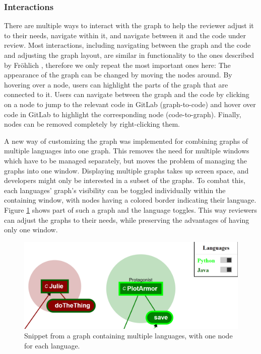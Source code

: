\documentclass[a4paper,11pt,twoside]{article}
\theoremstyle{definition} %
\renewcommand{\cite}[1]{\citep{#1}}
\begin{document}
\subsubsection{Interactions} \label{SubSubSec:FrontendInteractions}
There are multiple ways to interact with the graph to help the reviewer adjust it to their needs, navigate within it, and navigate between it and the code under review. Most interactions, including navigating between the graph and the code and adjusting the graph layout, are similar in functionality to the ones described by Fröhlich \cite{publication-20661}, therefore we only repeat the most important ones here: The appearance of the graph can be changed by moving the nodes around. By hovering over a node, users can highlight the parts of the graph that are connected to it. Users can navigate between the graph and the code by clicking on a node to jump to the relevant code in GitLab (graph-to-code) and hover over code in GitLab to highlight the corresponding node (code-to-graph). Finally, nodes can be removed completely by right-clicking them.

A new way of customizing the graph was implemented for combining graphs of multiple languages into one graph. This removes the need for multiple windows which have to be managed separately, but moves the problem of managing the graphs into one window. Displaying multiple graphs takes up screen space, and developers might only be interested in a subset of the graphs. To combat this, each languages’ graph’s visibility can be toggled individually within the containing window, with nodes having a colored border indicating their language. Figure \ref{fig:MultiLanguageExample} shows part of such a graph and the language toggles. This way reviewers can adjust the graphs to their needs, while preserving the advantages of having only one window.

\begin{figure}[h]
    \centering
    \includegraphics[width=1.0\textwidth]{Subfigures/multi_language_snippet.PNG}
    \caption{Snippet from a graph containing multiple languages, with one node for each language.}
    \label{fig:MultiLanguageExample}
\end{figure}
\end{document}
